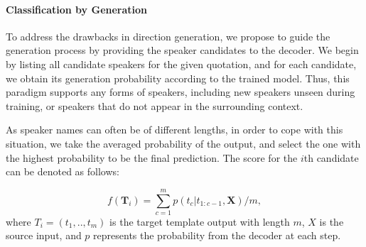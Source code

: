\documentclass[letterpaper]{article} %
\begin{document}
\paragraph{Classification by Generation}
To address the drawbacks in direction generation, we propose to guide the generation process by providing the speaker candidates to the decoder.
We begin by listing all candidate speakers for the given quotation, and for each candidate, we obtain its generation probability according to the trained model. Thus, this paradigm supports any forms of speakers, including new speakers unseen during training, or speakers that do not appear in the surrounding context.

As speaker names can often be of different lengths, in order to cope with this situation, we take the averaged probability of the output, and select the one with the highest probability to be the final prediction. The score for the $i$th candidate can be denoted as follows:


\begin{equation}
\label{eq2}
f(\mathbf{T}_{i}) = \sum_{c=1}^{m} p(t_{c}|t_{1:c-1}, \mathbf{X}) / m,
\end{equation}
where $T_i = (t_1, .., t_m)$ is the target template output with length $m$, $X$ is the source input, and $p$ represents the probability from the decoder at each step.
\end{document}

